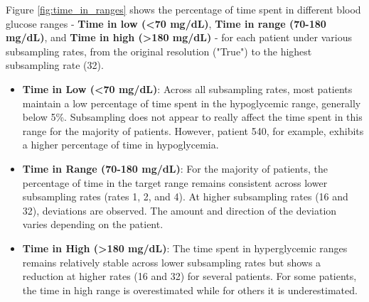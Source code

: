 Figure \ref{fig:time_in_ranges} shows the percentage of time spent in different blood glucose ranges - \textbf{Time in low (<70 mg/dL)}, \textbf{Time in range (70-180 mg/dL)},  and \textbf{Time in high (>180 mg/dL)} - for each patient under various subsampling rates, from the original resolution ("True") to the highest subsampling rate (32). 
\begin{itemize}
	\item \textbf{Time in Low (<70 mg/dL)}: Across all subsampling rates, most patients maintain a low percentage of time spent in the hypoglycemic range, generally below 5\%. Subsampling does not appear to really affect the time spent in this range for the majority of patients. However, patient 540, for example, exhibits a higher percentage of time in hypoglycemia.
	\item \textbf{Time in Range (70-180 mg/dL)}: For the majority of patients, the percentage of time in the target range remains consistent across lower subsampling rates (rates 1, 2, and 4). At higher subsampling rates (16 and 32), deviations are observed. The amount and direction of the deviation varies depending on the patient. 
	\item \textbf{Time in High (>180 mg/dL)}: The time spent in hyperglycemic ranges remains relatively stable across lower subsampling rates but shows a reduction at higher rates (16 and 32) for several patients. For some patients, the time in high range is overestimated while for others it is underestimated.
\end{itemize}



